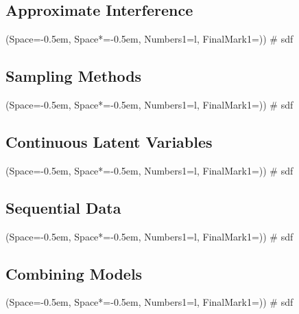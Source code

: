 \documentclass[12pt, a4paper]{article}
\newcommand{\listSpace}{-0.5em}%
\begin{document}
\subsection{Approximate Interference}
\begin{easylist}[itemize]
	\ListProperties(Space=\listSpace, Space*=\listSpace, Numbers1=l, FinalMark1={)})
	# sdf
\end{easylist}

\subsection{Sampling Methods}
\begin{easylist}[itemize]
	\ListProperties(Space=\listSpace, Space*=\listSpace, Numbers1=l, FinalMark1={)})
	# sdf
\end{easylist}

\subsection{Continuous Latent Variables}
\begin{easylist}[itemize]
	\ListProperties(Space=\listSpace, Space*=\listSpace, Numbers1=l, FinalMark1={)})
	# sdf
\end{easylist}

\subsection{Sequential Data}
\begin{easylist}[itemize]
	\ListProperties(Space=\listSpace, Space*=\listSpace, Numbers1=l, FinalMark1={)})
	# sdf
\end{easylist}

\subsection{Combining Models}
\begin{easylist}[itemize]
	\ListProperties(Space=\listSpace, Space*=\listSpace, Numbers1=l, FinalMark1={)})
	# sdf
\end{easylist}
\end{document}
